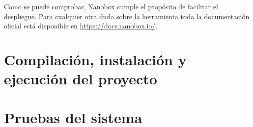 Como se puede comprobar, Nanobox cumple el propósito de facilitar el despliegue.
Para cualquier otra duda sobre la herramienta toda la documentación oficial está
disponible en \url{https://docs.nanobox.io/}.\\
\section{Compilación, instalación y ejecución del proyecto}

\section{Pruebas del sistema}

